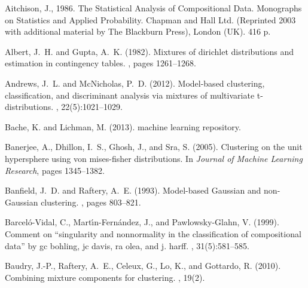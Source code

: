 \documentclass[10pt, a4paper]{article}
\begin{document}
\begin{thebibliography}{00}

Aitchison, J., 1986. The Statistical Analysis of Compositional Data. Monographs on Statistics and
Applied Probability. Chapman and Hall Ltd. (Reprinted 2003 with additional material by The
Blackburn Press), London (UK). 416 p.

Albert, J.~H. and Gupta, A.~K. (1982).
\newblock Mixtures of dirichlet distributions and estimation in contingency
  tables.
, pages 1261--1268.

Andrews, J.~L. and McNicholas, P.~D. (2012).
\newblock Model-based clustering, classification, and discriminant analysis via
  mixtures of multivariate t-distributions.
, 22(5):1021--1029.

Bache, K. and Lichman, M. (2013).
 machine learning repository.

Banerjee, A., Dhillon, I.~S., Ghosh, J., and Sra, S. (2005).
\newblock Clustering on the unit hypersphere using von mises-fisher
  distributions.
\newblock In {\em Journal of Machine Learning Research}, pages 1345--1382.

Banfield, J.~D. and Raftery, A.~E. (1993).
\newblock Model-based Gaussian and non-Gaussian clustering.
, pages 803--821.

Barcel{\'o}-Vidal, C., Mart{\'\i}n-Fern{\'a}ndez, J., and Pawlowsky-Glahn, V.
  (1999).
\newblock Comment on ``singularity and nonnormality in the classification of
  compositional data'' by gc bohling, jc davis, ra olea, and j. harff.
, 31(5):581--585.


Baudry, J.-P., Raftery, A.~E., Celeux, G., Lo, K., and Gottardo, R. (2010).
\newblock Combining mixture components for clustering.
, 19(2).


\end{thebibliography}
\end{document}
